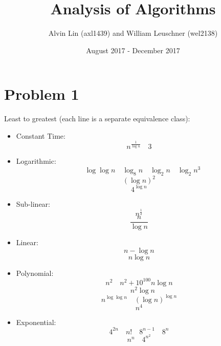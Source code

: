 \documentclass{math}
\title{Analysis of Algorithms}
\author{Alvin Lin (axl1439) and William Leuschner (wel2138)}
\date{August 2017 - December 2017}
\begin{document}
\maketitle

\section*{Problem 1}
Least to greatest (each line is a separate equivalence class):
\begin{itemize}
  \item Constant Time:
  \[ n^{\frac{1}{\log n}} \quad 3 \]
  \item Logarithmic:
  \[ \quad \log\log n \quad \log_8 n \quad \log_2 n \quad \log_2 n^3 \]
  \[ (\log n)^2 \]
  \[ 4^{\log n} \]
  \item Sub-linear:
  \[ n^{\frac{1}{2}} \]
  \[ \frac{n}{\log n} \]
  \item Linear:
  \[ n-\log n \]
  \[ n\log n \]
  \item Polynomial:
  \[ n^2 \quad n^2+10^{100}n\log n \]
  \[ \quad n^2\log n \]
  \[ n^{\log\log n} \quad (\log n)^{\log n} \]
  \[ n^4 \]
  \item Exponential:
  \[ 4^{2n} \quad n! \quad 8^{n-1} \quad 8^n \]
  \[ n^n\quad 4^{n^2} \]
\end{itemize}
\end{document}

